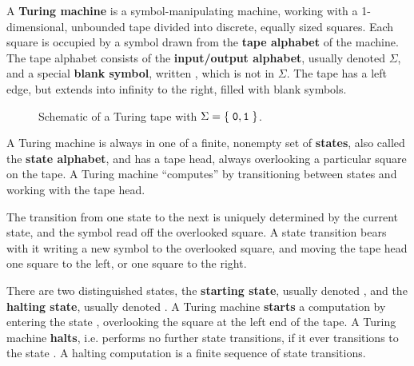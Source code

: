 A \textbf{Turing machine} is a symbol-manipulating machine, working with a
1-dimensional, unbounded tape divided into discrete, equally sized squares.
Each square is occupied by a symbol drawn from the \textbf{tape alphabet} of
the machine.  The tape alphabet consists of the \textbf{input/output alphabet},
usually denoted $\Sigma$, and a special \textbf{blank symbol}, written \blank,
which is not in $\Sigma$. The tape has a left edge, but extends into infinity
to the right, filled with blank symbols.


\begin{figure}[h!]
\centering
{}
\caption[]{Schematic of a Turing tape with $\Sigma=\mathopen{}\left\{\mathrel{}{\mathtt{0},\mathtt{1}}\mathrel{}\right\}\mathclose{}$.}
\label{fig:turing-tape}
\end{figure}

A Turing machine is always in one of a finite, nonempty set of \textbf{states},
also called the \textbf{state alphabet}, and has a tape head, always
overlooking a particular square on the tape. A Turing machine ``computes'' by
transitioning between states and working with the tape head.

The transition from one state to the next is uniquely determined by the current
state, and the symbol read off the overlooked square. A state transition bears
with it writing a new symbol to the overlooked square, and moving the tape head
one square to the left, or one square to the right.

There are two distinguished states, the \textbf{starting state}, usually
denoted \qstart, and the \textbf{halting state}, usually denoted \qhalt. A
Turing machine \textbf{starts} a computation by entering the state \qstart,
overlooking the square at the left end of the tape. A Turing machine
\textbf{halts}, i.e.  performs no further state transitions, if it ever
transitions to the state \qhalt. A halting computation is a finite sequence of
state transitions.

